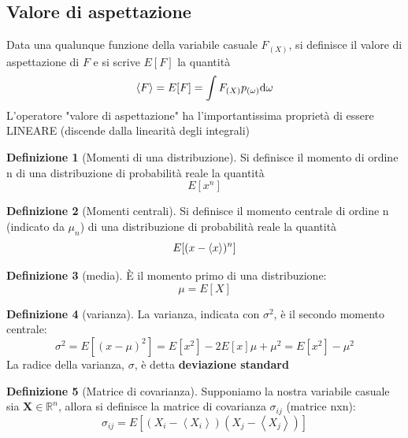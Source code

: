 \documentclass[a4paper,12pt]{article}
\renewcommand{\arg}[1]{_{(#1)}}
\theoremstyle{plain}
\renewcommand{\vec}[1]{{\boldsymbol{#1}}}
\theoremstyle{definition}
\newtheorem{defn}{Definizione}[section]
\newcommand{\ave}[1]{\left\langle#1\right\rangle }
\renewcommand{\d}{\text{d}}
\theoremstyle{remark}
\begin{document}
\subsection{Valore di aspettazione}
Data una qualunque funzione della variabile casuale $F\arg{X}$, si definisce il valore di aspettazione di $F$ e si scrive $E[F]$ la quantità
\[\expval{F}=E[F]=\int F\arg{X}p\arg{\omega}\d\omega		\]
L'operatore "valore di aspettazione" ha l'importantissima proprietà di essere LINEARE (discende dalla linearità degli integrali)
\begin{defn}[Momenti di una distribuzione]
	Si definisce il momento di ordine n di una distribuzione di probabilità reale la quantità \[E[x^n]\]
\end{defn}\begin{defn}[Momenti centrali]
Si definisce il momento centrale di ordine n (indicato da $\mu_n$) di una distribuzione di probabilità reale la quantità \[E[(x-\expval{x})^n]\]
\end{defn}
\begin{defn}[media]
	È il momento primo di una distribuzione:
	\[\mu=E[X]\]
\end{defn}
\begin{defn}[varianza]
La varianza, indicata con	$\sigma^2$, è il secondo momento centrale:
\[\sigma^2=E[(x-\mu)^2]=E[x^2]-2E[x]\mu+\mu^2=E[x^2]-\mu^2		\]
La radice della varianza, $\sigma$, è detta \textbf{deviazione standard}

\end{defn}
\begin{defn}[Matrice di covarianza]
	Supponiamo la nostra variabile casuale sia $\vec{X}\in\mathbb{R}^n$, allora si definisce la matrice di covarianza $\sigma_{ij}$ (matrice nxn):\[\sigma_{ij}=E[(X_i-\ave{X_i})(X_j-\ave{X_j})]\]
\end{defn}
\end{document}
